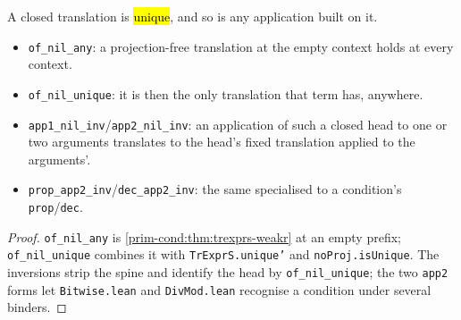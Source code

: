 \begin{lemma}
  \label{prim-cond:family:trexprs-nil-inv}
  \leanok

   A closed translation is \hl{unique}, and so is any application built on it.
  \begin{itemize}
  \item \texttt{of\_nil\_any}: a projection-free translation at the empty context holds at every
    context.
  \item \texttt{of\_nil\_unique}: it is then the only translation that term has, anywhere.
  \item \texttt{app1\_nil\_inv}/\texttt{app2\_nil\_inv}: an application of such a closed head to one
    or two arguments translates to the head's fixed translation applied to the arguments'.
  \item \texttt{prop\_app2\_inv}/\texttt{dec\_app2\_inv}: the same specialised to a condition's
    \texttt{prop}/\texttt{dec}.
  \end{itemize}
\end{lemma}
\begin{proof}
  \leanok
   \texttt{of\_nil\_any} is \ref{prim-cond:thm:trexprs-weakr} at an empty prefix;
  \texttt{of\_nil\_unique} combines it with \texttt{TrExprS.unique'} and \texttt{noProj.isUnique}.
  The inversions strip the spine and identify the head by \texttt{of\_nil\_unique}; the two
  \texttt{app2} forms let \texttt{Bitwise.lean} and \texttt{DivMod.lean} recognise a condition
  under several binders.
\end{proof}

